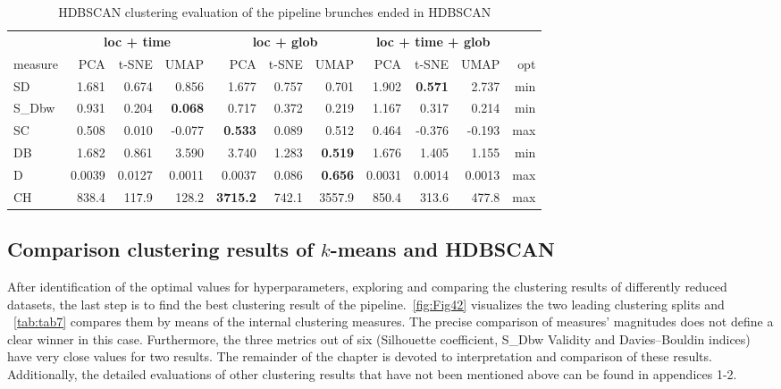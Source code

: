 \begin{table}
\begin{center}
\small
\begin{tabular}{lrrrrrrrrrr}
\hline
\multicolumn{1}{l}{ } & \multicolumn{3}{c}{\textbf{loc + time}} & \multicolumn{3}{c}{\textbf{loc + glob}} & \multicolumn{3}{c}{\textbf{loc + time + glob}} \\
\cline{1-1} \cline{2-4} \cline{5-7} \cline{8-10} 
measure & PCA & t-SNE & UMAP & PCA & t-SNE & UMAP & PCA & t-SNE & UMAP & opt\\
\hline
SD     & 1.681 & 0.674 & 0.856 & 1.677 & 0.757 & 0.701 & 1.902 & \textbf{0.571} & 2.737 & min \\
S\_Dbw & 0.931 & 0.204 & \textbf{0.068} & 0.717 & 0.372 & 0.219 & 1.167 & 0.317 & 0.214 & min \\
SC     & 0.508 & 0.010 & -0.077 & \textbf{0.533} & 0.089 & 0.512 & 0.464 & -0.376 & -0.193 & max \\
DB     & 1.682 & 0.861 & 3.590 & 3.740 & 1.283 & \textbf{0.519} & 1.676 & 1.405 & 1.155 & min \\
D      & 0.0039 & 0.0127 & 0.0011 & 0.0037 & 0.086 & \textbf{0.656} & 0.0031 & 0.0014 & 0.0013&max\\
CH     & 838.4 & 117.9 & 128.2 & \textbf{3715.2} & 742.1 & 3557.9 & 850.4 & 313.6 & 477.8 & max \\
\hline
\end{tabular}
\caption {HDBSCAN clustering evaluation of the pipeline brunches ended in HDBSCAN}
\label{tab:tab6}
\end{center}
\end {table}

\subsection{Comparison clustering results of $k$-means and HDBSCAN}
\label{Comparison clustering results of $k$-means and HDBSCAN}

After identification of the optimal values for hyperparameters, exploring and comparing the clustering results of differently reduced datasets, the last step is to find the best clustering result of the pipeline.~\autoref{fig:Fig42} visualizes the two leading clustering splits and ~\autoref{tab:tab7} compares them by means of the internal clustering measures. The precise comparison of measures' magnitudes does not define a clear winner in this case. Furthermore, the three metrics out of six (Silhouette coefficient, S\_Dbw Validity and Davies–Bouldin indices) have very close values for two results. The remainder of the chapter is devoted to interpretation and comparison of these results. Additionally, the detailed evaluations of other clustering results that have not been mentioned above can be found in appendices 1-2.

